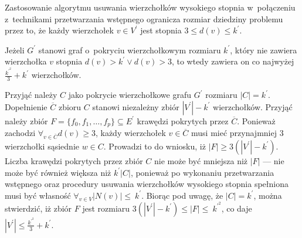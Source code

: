 Zastosowanie algorytmu usuwania wierzchołków wysokiego stopnia w~połączeniu 
z~technikami przetwarzania wstępnego ogranicza rozmiar dziedziny problemu przez
to, że każdy wierzchołek $v \in V^\prime$ jest stopnia $3 \leq d(v) \leq k^\prime$.

\begin{theorem}
  Jeżeli $G^\prime$ stanowi graf o~pokryciu wierzchołkowym rozmiaru $k^\prime$, który nie zawiera wierzchołka $v$ stopnia $d(v) > k^\prime \lor d(v) > 3$, to
  wtedy zawiera on co najwyżej $\frac{k^\prime^2}{3} + k^\prime$ wierzchołków.
\end{theorem}
\begin{bproof}
  Przyjąć należy $C$ jako pokrycie wierzchołkowe grafu $G^\prime$ rozmiaru $|C|=k^\prime$.
  Dopełnienie $\overline{C}$ zbioru $C$ stanowi niezależny zbiór
  $|V^\prime|-k^\prime$ wierzchołków.
  Przyjąć należy zbiór $F=\{f_0,f_1, \ldots, f_p\} \subseteq E^\prime$ krawędzi pokrytych przez $\overline{C}$.
  Ponieważ zachodzi $\forall_{v \in \overline{C}}{d(v) \geq 3}$, każdy
  wierzchołek $v \in \overline{C}$ musi mieć przynajmniej 3 wierzchołki sąsiednie
  $w \in C$.
  Prowadzi to do wniosku, iż $|F| \geq 3(|V^\prime| - k^\prime)$.
  Liczba krawędzi pokrytych przez zbiór $C$ nie może być mniejsza niż $|F|$ --- nie
  może być również większa niż $k^\prime|C|$, ponieważ po wykonaniu
  przetwarzania wstępnego oraz procedury usuwania wierzchołków wysokiego stopnia spełniona musi być własność $\forall_{v \in V}{|N(v)|\leq~k^\prime}$.
  Biorąc pod uwagę, że $|C|=k^\prime$, można stwierdzić, iż zbiór $F$ jest rozmiaru ${3(|V^\prime|-k^\prime)\leq|F|\leq~k^\prime^2}$, co daje ${|V^\prime|\leq\frac{k^\prime^2}{3}+k^\prime}$.
\end{bproof}



